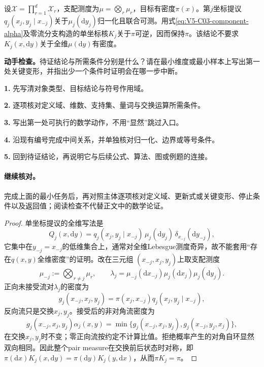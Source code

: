 \begin{theorem}[连续单坐标MH的独立不变性证明]\label{thm:V5-C03-coordinate-kernel}
设$\mathcal X=\prod_{r=1}^d\mathcal X_r$，支配测度为$\mu=\bigotimes_r\mu_r$，目标有密度$\pi(x)$。第$j$坐标提议$q_j(x_j,y_j\mid x_{-j})$关于$\mu_j(\mathrm dy_j)$归一化且联合可测。用式\eqref{eq:V5-C03-component-alpha}及零流分支构造的单坐标核$K_j$关于$\pi$可逆，因而保持$\pi$。该结论不要求$K_j(x,\mathrm dy)$关于全维$\mu(\mathrm dy)$有密度。
\end{theorem}
\begin{keypointbox}[title={证明：连续单坐标MH的独立不变性证明：证明阅读检查}]
\textbf{动手检查。}待证结论与所需条件分别是什么？请在最小维度或最小样本上写出第一处关键变形，并指出少一个条件时证明会在哪一步中断。\par
\textbf{1.} 先写清对象类型、目标结论与符号作用域。\par
\textbf{2.} 逐项核对定义域、维数、支持集、量词与交换运算所需条件。\par
\textbf{3.} 写出第一处可执行的数学动作，不用“显然”跳过入口。\par
\textbf{4.} 沿现有编号完成中间关系，并单独核对归一化、边界或等号条件。\par
\textbf{5.} 回到待证结论，再说明它与后续公式、算法、图或例题的连接。
\end{keypointbox}
\paragraph{继续核对。}完成上面的最小任务后，再对照主体逐项核对定义域、更新式或关键变形、停止条件以及返回值；阅读检查不代替正文中的数学论证。

\begin{proof}
单坐标提议的全维写法是
\[
Q_j(x,\mathrm dy)=q_j(x_j,y_j\mid x_{-j})\,
\mu_j(\mathrm dy_j)\,\delta_{x_{-j}}(\mathrm dy_{-j}),
\]
它集中在$y_{-j}=x_{-j}$的低维集合上，通常对全维Lebesgue测度奇异，故不能套用“存在$q(x,y)$全维密度”的证明。改在三元组
$(x_{-j},x_j,y_j)$上取支配测度
\[
\mu_{-j}:=\bigotimes_{r\ne j}\mu_r,\qquad
\lambda_j=\mu_{-j}(\mathrm dx_{-j})\mu_j(\mathrm dx_j)\mu_j(\mathrm dy_j).
\]
正向未接受流对$\lambda_j$的密度为
\[
g_j(x_{-j},x_j,y_j)=
\pi(x_j,x_{-j})q_j(x_j,y_j\mid x_{-j}),
\]
反向流只是交换$x_j,y_j$。接受后的非对角流密度为
\[
g_j(x_{-j},x_j,y_j)\alpha_j(x,y)
=\min\{g_j(x_{-j},x_j,y_j),g_j(x_{-j},y_j,x_j)\},
\]
在交换$x_j,y_j$时不变；零正向流按约定不计算比值。拒绝概率产生的对角自环显然双向相同。因此整个pair measure在交换前后状态时对称，即$\pi(\mathrm dx)K_j(x,\mathrm dy)=\pi(\mathrm dy)K_j(y,\mathrm dx)$，从而$\pi K_j=\pi$。
\end{proof}

